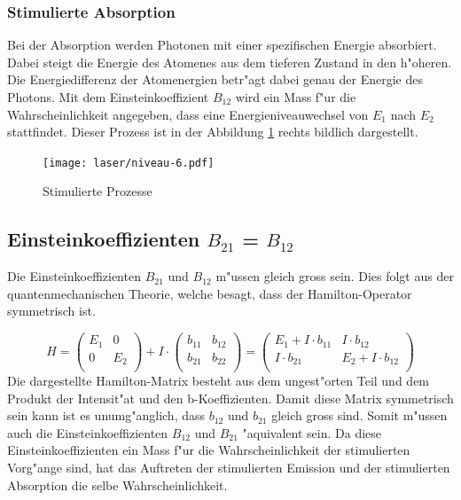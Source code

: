 \begin{refsection}
\subsubsection{Stimulierte Absorption}
Bei der Absorption werden Photonen mit einer spezifischen Energie absorbiert.
Dabei steigt die Energie des Atomenes aus dem tieferen Zustand in den
h"oheren.
Die Energiedifferenz der Atomenergien betr"agt dabei genau der Energie des
Photons.
Mit dem Einsteinkoeffizient $B_{12}$ wird ein Mass f"ur die
Wahrscheinlichkeit angegeben, dass eine Energieniveauwechsel von $E_1$ nach
$E_2$ stattfindet.
Dieser Prozess ist in der Abbildung \ref{Stimulierte Prozesse} rechts bildlich
dargestellt.

\begin{figure}
\centering
\texttt{[image: laser/niveau-6.pdf]}
\caption{Stimulierte Prozesse}
\label{Stimulierte Prozesse}
\end{figure}


\subsection{Einsteinkoeffizienten $B_{21}$ = $B_{12}$}
\label{B21=B12}
Die Einsteinkoeffizienten $B_{21}$ und $B_{12}$ m"ussen gleich gross sein.
Dies folgt aus der quantenmechanischen Theorie, welche besagt, dass der
Hamilton-Operator symmetrisch ist.

\[
H =\begin{pmatrix}
E_1 & 0  \\
0   & E_2 \\
\end{pmatrix}
+ I\cdot \begin{pmatrix}
b_{11} & b_{12}  \\
b_{21} & b_{22} \\
\end{pmatrix}
=\begin{pmatrix}
E_1+ I\cdot b_{11} & I\cdot b_{12}  \\
I\cdot b_{21} & E_2+I\cdot b_{12} \\
\end{pmatrix}
\]
Die dargestellte Hamilton-Matrix besteht aus dem ungest"orten Teil und 
dem Produkt der Intensit"at und den b-Koeffizienten.
Damit diese Matrix symmetrisch sein kann ist es unumg"anglich, dass $b_{12}$
und $b_{21}$ gleich gross sind.
Somit m"ussen auch die Einsteinkoeffizienten $B_{12}$ und $B_{21}$ "aquivalent
sein.
Da diese Einsteinkoeffizienten ein Mass f"ur die Wahrscheinlichkeit der
stimulierten Vorg"ange sind, hat das Auftreten der stimulierten Emission und
der stimulierten Absorption die selbe Wahrscheinlichkeit.


\end{refsection}

